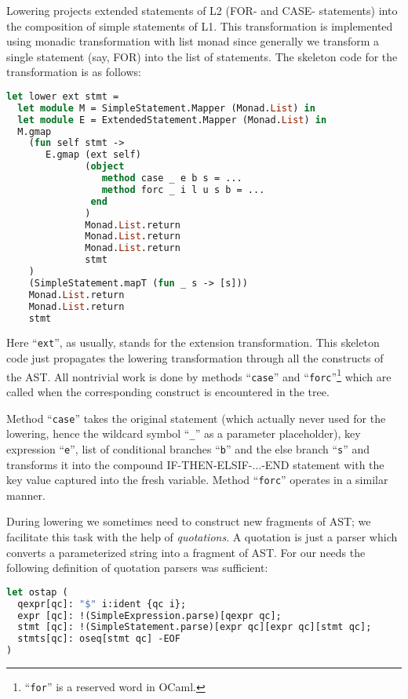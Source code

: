 Lowering projects extended statements of L2 (FOR- and CASE- statements) into the composition
of simple statements of L1. This transformation is implemented using monadic transformation
with list monad since generally we transform a single statement (say, FOR) into the list
of statements. The skeleton code for the transformation is as follows:

\begin{lstlisting}[language=ocaml]
let lower ext stmt =
  let module M = SimpleStatement.Mapper (Monad.List) in 
  let module E = ExtendedStatement.Mapper (Monad.List) in
  M.gmap 
    (fun self stmt ->
       E.gmap (ext self)
              (object
                 method case _ e b s = ...
                 method forc _ i l u s b = ...
               end
              ) 
              Monad.List.return 
              Monad.List.return 
              Monad.List.return 
              stmt
    )
    (SimpleStatement.mapT (fun _ s -> [s])) 
    Monad.List.return 
    Monad.List.return
    stmt
\end{lstlisting}

Here ``\lstinline{ext}'', as usually, stands for the extension transformation. This skeleton
code just propagates the lowering transformation through all the constructs of the AST. All
nontrivial work is done by methods ``\lstinline{case}'' and 
``\lstinline{forc}''\footnote{``\lstinline{for}'' is a reserved word in OCaml.} which are 
called when the corresponding construct is encountered in the tree.

Method ``\lstinline{case}'' takes the original statement (which actually never used for the lowering, 
hence the wildcard symbol ``\lstinline{_}'' as a parameter placeholder), key expression ``\lstinline{e}'',
list of conditional branches ``\lstinline{b}'' and the else branch ``\lstinline{s}'' and transforms it 
into the compound \mbox{IF-THEN-ELSIF-...-END} statement with the key value captured into the fresh variable.
Method ``\lstinline{forc}'' operates in a similar manner.

During lowering we sometimes need to construct new fragments of AST; we facilitate this task
with the help of \emph{quotations}. A quotation is just a parser which converts a parameterized 
string into a fragment of AST. For our needs the following definition of quotation parsers was
sufficient:

\begin{lstlisting}[language=ocaml]
let ostap (
  qexpr[qc]: "$" i:ident {qc i};
  expr [qc]: !(SimpleExpression.parse)[qexpr qc];
  stmt [qc]: !(SimpleStatement.parse)[expr qc][expr qc][stmt qc];
  stmts[qc]: oseq[stmt qc] -EOF
)
\end{lstlisting}

